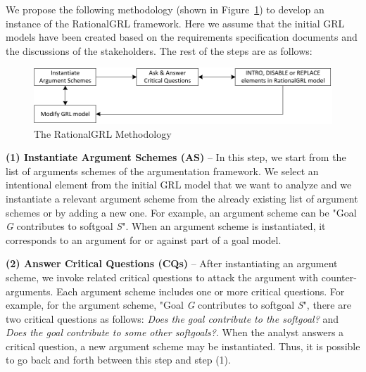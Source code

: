 We propose the following methodology (shown in Figure~\ref{fig:rationalgrl-methodology}) to develop an instance of the RationalGRL framework. Here we assume that the initial GRL models have been created based on the requirements specification documents and the discussions of the stakeholders. The rest of the steps are as follows:

\begin{figure}[ht]
\centering
\includegraphics[scale=0.4]{img/methodology}
\caption{The RationalGRL Methodology}
\label{fig:rationalgrl-methodology}
\end{figure}


\textbf{(1) Instantiate Argument Schemes (AS)} -- In this step, we start from the list of arguments schemes of the argumentation framework. We select an intentional element from the initial GRL model that we want to analyze and we instantiate a relevant argument scheme from the already existing list of argument schemes or by adding a new one. For example, an argument scheme can be "Goal \emph{G} contributes to softgoal \emph{S}". When an argument scheme is instantiated, it corresponds to  an argument for or against part of a goal model.

\textbf{(2) Answer Critical Questions (CQs)} -- After instantiating an argument scheme, we invoke related critical questions to attack the argument with counter-arguments.  Each argument scheme includes one or more critical questions. For example, for the argument scheme, "Goal \emph{G} contributes to softgoal \emph{S}", there are two critical questions as follows:  \emph{Does the goal contribute to the softgoal?} and \emph{Does the goal contribute to some other softgoals?}. 
When the analyst answers  a critical question, a new argument scheme may be instantiated.  Thus, it is possible to go back and forth between this step and step (1).

